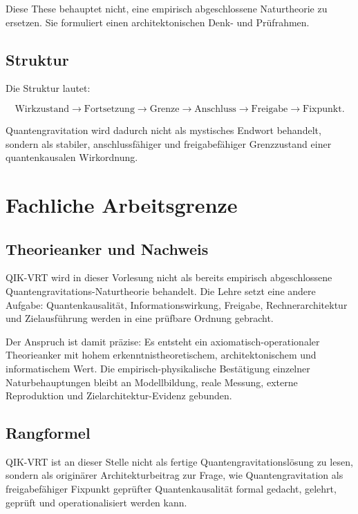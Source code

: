 \documentclass[11pt,a4paper,oneside]{book}
\begin{document}
Diese These behauptet nicht, eine empirisch abgeschlossene Naturtheorie zu ersetzen. Sie formuliert einen architektonischen Denk- und Prüfrahmen.

\section{Struktur}

Die Struktur lautet:

\[
\text{Wirkzustand}\rightarrow\text{Fortsetzung}\rightarrow\text{Grenze}\rightarrow\text{Anschluss}\rightarrow\text{Freigabe}\rightarrow\text{Fixpunkt}.
\]

Quantengravitation wird dadurch nicht als mystisches Endwort behandelt, sondern als stabiler, anschlussfähiger und freigabefähiger Grenzzustand einer quantenkausalen Wirkordnung.

\chapter{Fachliche Arbeitsgrenze}

\section{Theorieanker und Nachweis}

QIK-VRT wird in dieser Vorlesung nicht als bereits empirisch abgeschlossene Quantengravitations-Naturtheorie behandelt. Die Lehre setzt eine andere Aufgabe: Quantenkausalität, Informationswirkung, Freigabe, Rechnerarchitektur und Zielausführung werden in eine prüfbare Ordnung gebracht.

Der Anspruch ist damit präzise: Es entsteht ein axiomatisch-operationaler Theorieanker mit hohem erkenntnistheoretischem, architektonischem und informatischem Wert. Die empirisch-physikalische Bestätigung einzelner Naturbehauptungen bleibt an Modellbildung, reale Messung, externe Reproduktion und Zielarchitektur-Evidenz gebunden.

\section{Rangformel}

\begin{merkbox}
QIK-VRT ist an dieser Stelle nicht als fertige Quantengravitationslösung zu lesen, sondern als originärer Architekturbeitrag zur Frage, wie Quantengravitation als freigabefähiger Fixpunkt geprüfter Quantenkausalität formal gedacht, gelehrt, geprüft und operationalisiert werden kann.
\end{merkbox}
\end{document}

